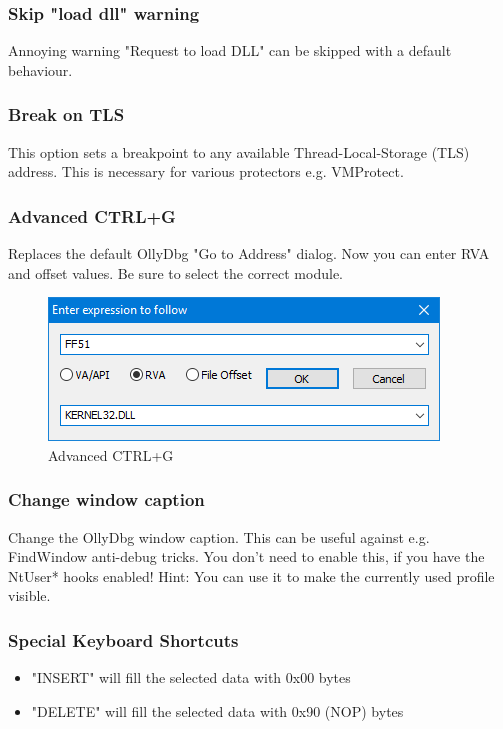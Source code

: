 \documentclass[10pt,a4paper]{article}
\begin{document}
\subsubsection{Skip "load dll" warning}
Annoying warning "Request to load DLL" can be skipped with a default behaviour.
\subsubsection{Break on TLS}
This option sets a breakpoint to any available Thread-Local-Storage (TLS) address. This is necessary for various protectors e.g. VMProtect.
\subsubsection{Advanced CTRL+G}
Replaces the default OllyDbg "Go to Address" dialog. Now you can enter RVA and offset values. Be sure to select the correct module.

\begin{figure}[H]
\centering
\includegraphics[scale=1]{ollyadvancedctrlg.PNG}
\caption{Advanced CTRL+G}
\end{figure}

\subsubsection{Change window caption}
Change the OllyDbg window caption. This can be useful against e.g. FindWindow anti-debug tricks. You don't need to enable this, if you have the NtUser* hooks enabled! Hint: You can use it to make the currently used profile visible.

\subsubsection{Special Keyboard Shortcuts}

\begin{itemize}
\item "INSERT" will fill the selected data with 0x00 bytes
\item "DELETE" will fill the selected data with 0x90 (NOP) bytes
\end{itemize}
\end{document}
